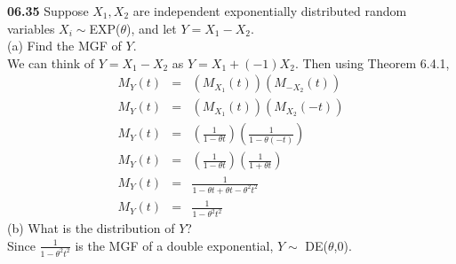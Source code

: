 {\bf 06.35}
Suppose $X_1, X_2$ are independent exponentially distributed random variables $X_i\sim$EXP($\theta$), and let $Y=X_1-X_2$.\\
(a) Find the MGF of $Y$.\\
We can think of $Y=X_1-X_2$ as $Y=X_1+(-1)X_2$. Then using Theorem 6.4.1,
\begin{eqnarray*}
M_{Y}(t) & = & (M_{X_1} (t))(M_{-X_2} (t))\\
M_{Y}(t) & = & (M_{X_1}(t))(M_{X_2}(-t))\\
M_{Y}(t) & = & \left(\frac{1}{1-\theta t}\right)\left(\frac{1}{1-\theta (-t)}\right)\\
M_Y(t) &=& \left(\frac{1}{1-\theta t}\right)\left(\frac{1}{1+\theta t}\right)\\
M_Y(t) & = & \frac{1}{1-\theta t +\theta t-\theta^2 t^2}\\
M_Y(t) & = & \frac{1}{1-\theta^2 t^2}
\end{eqnarray*}
(b) What is the distribution of $Y$?\\
Since $\frac{1}{1-\theta^2 t^2}$ is the MGF of a double exponential,  $Y\sim$ DE($\theta$,$0$).
\\
